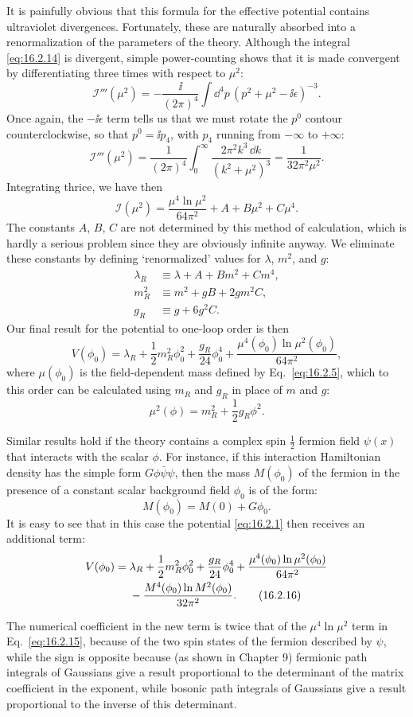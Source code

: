 It is painfully obvious that this formula for the effective potential
contains ultraviolet divergences. Fortunately, these are naturally absorbed
into a renormalization of the parameters of the theory. Although the
integral \eqref{eq:16.2.14} is divergent, simple power-counting shows that it is
made convergent by differentiating three times with respect to $\mu^2$:
\[
 \mathcal{I}'''(\mu^2) = -\frac{\ii}{(2\pi)^4}\int \dd^4p\,
 \left(p^2+\mu^2-\ii\epsilon\right)^{-3} .
\]
Once again, the $-\ii\epsilon$ term tells us that we must rotate the $p^0$ contour
counterclockwise, so that $p^0=\ii p_4$, with $p_4$ running from $-\infty$ to $+\infty$:
\[
 \mathcal{I}'''(\mu^2) = \frac{1}{(2\pi)^4}\int_0^\infty
 \frac{2\pi^2 k^3\,\dd k}{(k^2+\mu^2)^3} = \frac{1}{32\pi^2\mu^2} .
\]
Integrating thrice, we have then
\[
 \mathcal{I}(\mu^2) = \frac{\mu^4\ln\mu^2}{64\pi^2}+A+B\mu^2+C\mu^4 .
\]
The constants $A$, $B$, $C$ are not determined by this method of calculation,
which is hardly a serious problem since they are obviously infinite anyway.
We eliminate these constants by defining `renormalized' values for $\lambda$, $m^2$,
and $g$:
\begin{align*}
 \lambda_R &\equiv \lambda+A+Bm^2+Cm^4 ,\\
 m_R^2 &\equiv m^2+gB+2gm^2C ,\\
 g_R &\equiv g+6g^2C .
\end{align*}
Our final result for the potential to one-loop order is then
\begin{equation}
 V(\phi_0) = \lambda_R+\frac{1}{2}m_R^2\phi_0^2+\frac{g_R}{24}\phi_0^4
 +\frac{\mu^4(\phi_0)\ln\mu^2(\phi_0)}{64\pi^2} ,
 \tag{16.2.15}
 \label{eq:16.2.15}
\end{equation}
where $\mu(\phi_0)$ is the field-dependent mass defined by Eq.~\eqref{eq:16.2.5}, which to
this order can be calculated using $m_R$ and $g_R$ in place of $m$ and $g$:
\[
 \mu^2(\phi) = m_R^2+\frac{1}{2}g_R\phi^2 .
\]

Similar results hold if the theory contains a complex spin $\frac{1}{2}$ fermion
field $\psi(x)$ that interacts with the scalar $\phi$. For instance, if this interaction
Hamiltonian density has the simple form $G\phi\bar\psi\psi$, then the mass $M(\phi_0)$ of
the fermion in the presence of a constant scalar background field $\phi_0$ is of
the form:
\[
 M(\phi_0) = M(0)+G\phi_0 .
\]
It is easy to see that in this case the potential \eqref{eq:16.2.1} then receives an
additional term:
\begin{align}
 V(\phi_0) ={}& \lambda_R+\frac{1}{2}m_R^2\phi_0^2+\frac{g_R}{24}\phi_0^4
 +\frac{\mu^4(\phi_0)\ln\mu^2(\phi_0)}{64\pi^2} \notag\\
 &{}-\frac{M^4(\phi_0)\ln M^2(\phi_0)}{32\pi^2} .
 \tag{16.2.16}
 \label{eq:16.2.16}
\end{align}

The numerical coefficient in the new term is twice that of the $\mu^4\ln\mu^2$ term
in Eq.~\eqref{eq:16.2.15}, because of the two spin states of the fermion described by
$\psi$, while the sign is opposite because (as shown in Chapter 9) fermionic
path integrals of Gaussians give a result proportional to the determinant
of the matrix coefficient in the exponent, while bosonic path integrals of
Gaussians give a result proportional to the inverse of this determinant.
